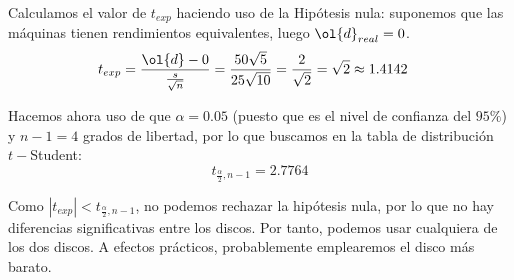 \documentclass[12pt]{article}
\begin{document}
\begin{ejercicio}[3 puntos]
        Calculamos el valor de $t_{exp}$ haciendo uso de la Hipótesis nula: suponemos que las máquinas tienen rendimientos equivalentes, luego $\ol{d}_{real}=0$.
        \begin{align*}
            t_{exp} &= \frac{\ol{d} - 0}{\frac{s}{\sqrt{n}}}
            = \frac{50\sqrt{5}}{25\sqrt{10}} = \frac{2}{\sqrt{2}} = \sqrt{2} \approx 1.4142
        \end{align*}

        Hacemos ahora uso de que $\alpha=0.05$ (puesto que es el nivel de confianza del $95\%$) y $n-1=4$ grados de libertad, por lo que buscamos en la tabla de distribución $t-$Student:
        \begin{equation*}
            t_{\frac{\alpha}{2},n-1} = 2.7764
        \end{equation*}

        Como $|t_{exp}| < t_{\frac{\alpha}{2},n-1}$, no podemos rechazar la hipótesis nula, por lo que no hay diferencias significativas entre los discos. Por tanto, podemos usar cualquiera de los dos discos. A efectos prácticos, probablemente emplearemos el disco más barato.
    \end{ejercicio}
\end{document}
